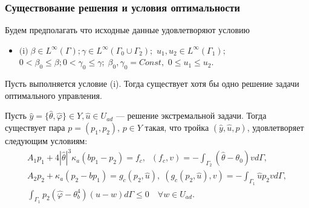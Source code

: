 \begin{frame}
    \frametitle{Существование решения и условия оптимальности}
    Будем предполагать что исходные данные удовлетворяют условию
    \begin{itemize}
        \item $\text{(i)}\;\beta\in L^\infty(\Gamma); \gamma \in L^\infty(\Gamma_0\cup\Gamma_2);$
        $u_1, u_2 \in L^\infty(\Gamma_1);$
        $0 < \beta_0 \le \beta; 0 < \gamma_0 \le \gamma;\; \beta_0,\gamma_0=Const,$
        $0 \le u_1 \le u_2$.
    \end{itemize}
    \begin{theorem}[2.1]
        Пусть выполняется условие (i).
        Тогда существует хотя бы одно решение задачи оптимального управления.
    \end{theorem}

    \begin{theorem}[2.2]
        \label{th:2_1:2}
        Пусть $\hat{y}=\{\hat{\theta},\hat{\varphi} \} \in Y, \hat{u} \in U_{ad}$
        --- решение экстремальной задачи.
        Тогда существует пара $p = (p_1, p_2)$, $p \in Y$
        такая, что тройка $(\hat{y}, \hat{u}, p)$, удовлетворяет следующим условиям:
        \begin{gather*}
            A_1 p_1 + 4 |\hat{\theta}|^3 \kappa_a(b p_1 - p_2) = f_c,
            \;\; (f_c,v) = - \int_{\Gamma_2} (\hat{\theta} - \theta_0) v d\Gamma, \\
            A_2 p_2 + \kappa_a (p_2-b p_1) = g_c(p_2, \hat{u}),
            \;(g_c(p_2, \hat{u}), v) = -\int_{\Gamma_1} \hat{u} p_2 v d\Gamma, \\
            \int_{\Gamma_1} p_2 (\hat{\varphi} - \theta_b^4)(u-w) d\Gamma
            \leq 0 \quad \forall w \in U_{ad}.
        \end{gather*}
    \end{theorem}
\end{frame}


